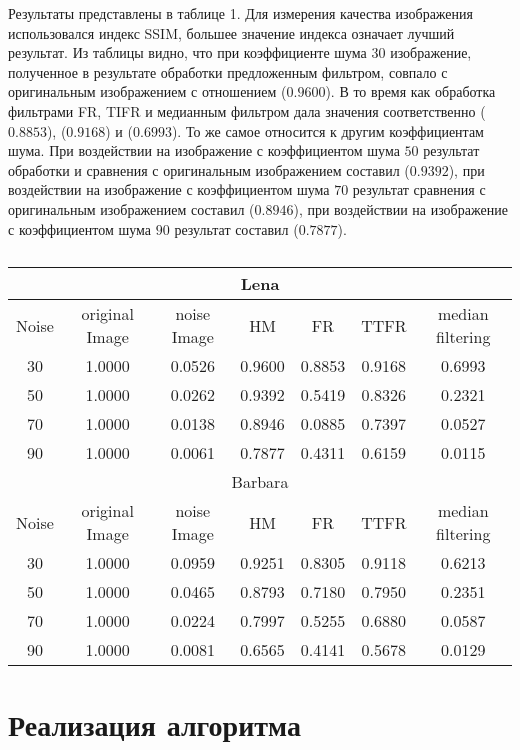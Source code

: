 Результаты представлены в таблице 1. Для измерения качества изображения
использовался индекс SSIM, большее значение индекса означает лучший результат.
Из таблицы видно, что при коэффициенте шума $30$ изображение, полученное в
результате обработки предложенным фильтром, совпало с оригинальным изображением
с отношением ($0.9600$). В то время как обработка фильтрами FR, TIFR и медианным
фильтром дала значения соответственно ($0.8853$), ($0.9168$) и ($0.6993$). То же
самое относится к другим коэффициентам шума. При воздействии на изображение с
коэффициентом шума $50$ результат обработки и сравнения с оригинальным
изображением составил ($0.9392$), при воздействии на изображение с коэффициентом
шума $70$ результат сравнения с оригинальным изображением составил ($0.8946$),
при воздействии на изображение с коэффициентом шума $90$ результат составил
($0.7877$).

\begin{table}[H]
    \centering
    \begin{tabular}{ccccccc}
        \hline
        \multicolumn{7}{c}{Lena} \\
        \hline
        Noise & original Image & noise Image & HM & FR & TTFR & median filtering \\
        30 & 1.0000 & 0.0526 & 0.9600 & 0.8853 & 0.9168 & 0.6993 \\
        50 & 1.0000 & 0.0262 & 0.9392 & 0.5419 & 0.8326 & 0.2321 \\
        70 & 1.0000 & 0.0138 & 0.8946 & 0.0885 & 0.7397 & 0.0527 \\
        90 & 1.0000 & 0.0061 & 0.7877 & 0.4311 & 0.6159 & 0.0115 \\
        \multicolumn{7}{c}{Barbara} \\
        Noise & original Image & noise Image & HM & FR & TTFR & median filtering \\
        30 & 1.0000 & 0.0959 & 0.9251 & 0.8305 & 0.9118 & 0.6213 \\
        50 & 1.0000 & 0.0465 & 0.8793 & 0.7180 & 0.7950 & 0.2351 \\
        70 & 1.0000 & 0.0224 & 0.7997 & 0.5255 & 0.6880 & 0.0587 \\
        90 & 1.0000 & 0.0081 & 0.6565 & 0.4141 & 0.5678 & 0.0129 \\
        \hline
    \end{tabular}
    \caption{}
\end{table}

\section{Реализация алгоритма}


